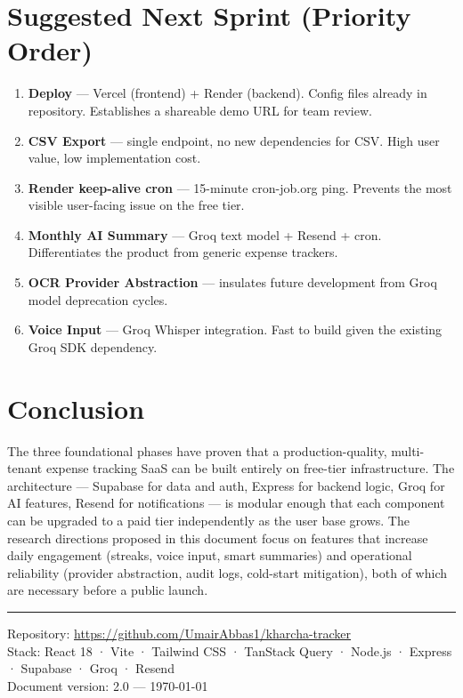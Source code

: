 \documentclass[11pt,a4paper]{article}
\begin{document}
\section{Suggested Next Sprint (Priority Order)}

\begin{enumerate}[leftmargin=1.2cm]
  \item \textbf{Deploy} — Vercel (frontend) + Render (backend). Config files
        already in repository. Establishes a shareable demo URL for team
        review.
  \item \textbf{CSV Export} — single endpoint, no new dependencies for CSV.
        High user value, low implementation cost.
  \item \textbf{Render keep-alive cron} — 15-minute cron-job.org ping.
        Prevents the most visible user-facing issue on the free tier.
  \item \textbf{Monthly AI Summary} — Groq text model + Resend + cron.
        Differentiates the product from generic expense trackers.
  \item \textbf{OCR Provider Abstraction} — insulates future development from
        Groq model deprecation cycles.
  \item \textbf{Voice Input} — Groq Whisper integration. Fast to build given
        the existing Groq SDK dependency.
\end{enumerate}

\section{Conclusion}

The three foundational phases have proven that a production-quality, multi-tenant
expense tracking SaaS can be built entirely on free-tier infrastructure. The
architecture — Supabase for data and auth, Express for backend logic, Groq for
AI features, Resend for notifications — is modular enough that each component
can be upgraded to a paid tier independently as the user base grows. The research
directions proposed in this document focus on features that increase daily
engagement (streaks, voice input, smart summaries) and operational reliability
(provider abstraction, audit logs, cold-start mitigation), both of which are
necessary before a public launch.

\vspace{1cm}
\noindent\rule{\textwidth}{0.4pt}
\small
\noindent Repository: \url{https://github.com/UmairAbbas1/kharcha-tracker} \\
Stack: React 18 · Vite · Tailwind CSS · TanStack Query · Node.js · Express · Supabase · Groq · Resend \\
Document version: 2.0 — \today
\end{document}
